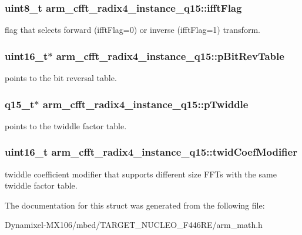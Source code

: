 \subsubsection[{\texorpdfstring{ifft\+Flag}{ifftFlag}}]{\setlength{\rightskip}{0pt plus 5cm}uint8\+\_\+t arm\+\_\+cfft\+\_\+radix4\+\_\+instance\+\_\+q15\+::ifft\+Flag}\hypertarget{structarm__cfft__radix4__instance__q15_a2ecff6ea735cb4d22e922d0fd5736655}{}\label{structarm__cfft__radix4__instance__q15_a2ecff6ea735cb4d22e922d0fd5736655}
flag that selects forward (ifft\+Flag=0) or inverse (ifft\+Flag=1) transform. 
\subsubsection[{\texorpdfstring{p\+Bit\+Rev\+Table}{pBitRevTable}}]{\setlength{\rightskip}{0pt plus 5cm}uint16\+\_\+t$\ast$ arm\+\_\+cfft\+\_\+radix4\+\_\+instance\+\_\+q15\+::p\+Bit\+Rev\+Table}\hypertarget{structarm__cfft__radix4__instance__q15_a4acf704ae0cf30b53bf0fbfae8e34a59}{}\label{structarm__cfft__radix4__instance__q15_a4acf704ae0cf30b53bf0fbfae8e34a59}
points to the bit reversal table. 
\subsubsection[{\texorpdfstring{p\+Twiddle}{pTwiddle}}]{\setlength{\rightskip}{0pt plus 5cm}q15\+\_\+t$\ast$ arm\+\_\+cfft\+\_\+radix4\+\_\+instance\+\_\+q15\+::p\+Twiddle}\hypertarget{structarm__cfft__radix4__instance__q15_a29dd693537e45421a36891f8439e1fba}{}\label{structarm__cfft__radix4__instance__q15_a29dd693537e45421a36891f8439e1fba}
points to the twiddle factor table. 
\subsubsection[{\texorpdfstring{twid\+Coef\+Modifier}{twidCoefModifier}}]{\setlength{\rightskip}{0pt plus 5cm}uint16\+\_\+t arm\+\_\+cfft\+\_\+radix4\+\_\+instance\+\_\+q15\+::twid\+Coef\+Modifier}\hypertarget{structarm__cfft__radix4__instance__q15_af32fdc78bcc27ca385f9b76a0a1f71c3}{}\label{structarm__cfft__radix4__instance__q15_af32fdc78bcc27ca385f9b76a0a1f71c3}
twiddle coefficient modifier that supports different size F\+F\+Ts with the same twiddle factor table. 

The documentation for this struct was generated from the following file\+:\begin{DoxyCompactItemize}
\item 
Dynamixel-\/\+M\+X106/mbed/\+T\+A\+R\+G\+E\+T\+\_\+\+N\+U\+C\+L\+E\+O\+\_\+\+F446\+R\+E/arm\+\_\+math.\+h\end{DoxyCompactItemize}
